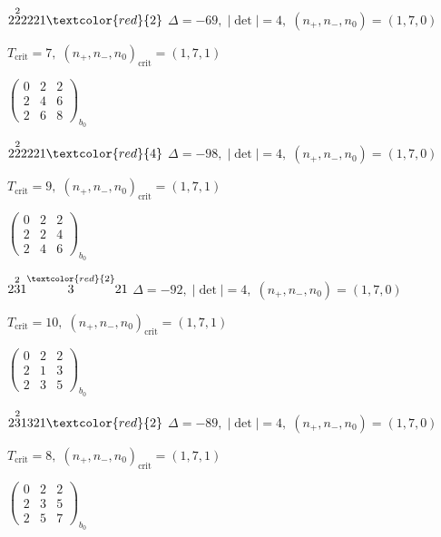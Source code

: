 \documentclass[10pt]{article}
\begin{document}
$2\overset{2}{2}2221\textcolor{red}{2}$ \quad $\Delta=-69,\; |\det|=4,\; (n_+,n_-,n_0)=(1,7,0)$

\hspace{1em}$T_{\text{crit}}=7,\; (n_+,n_-,n_0)_{\text{crit}}=(1,7,1)$

\hspace{2em}$\left(\begin{smallmatrix}0 & 2 & 2 \\ 2 & 4 & 6 \\ 2 & 6 & 8\end{smallmatrix}\right)_{\!b_0}$

$2\overset{2}{2}2221\textcolor{red}{4}$ \quad $\Delta=-98,\; |\det|=4,\; (n_+,n_-,n_0)=(1,7,0)$

\hspace{1em}$T_{\text{crit}}=9,\; (n_+,n_-,n_0)_{\text{crit}}=(1,7,1)$

\hspace{2em}$\left(\begin{smallmatrix}0 & 2 & 2 \\ 2 & 2 & 4 \\ 2 & 4 & 6\end{smallmatrix}\right)_{\!b_0}$

\smallskip

$2\overset{2}{3}1\overset{\textcolor{red}{2}}{3}21$ \quad $\Delta=-92,\; |\det|=4,\; (n_+,n_-,n_0)=(1,7,0)$

\hspace{1em}$T_{\text{crit}}=10,\; (n_+,n_-,n_0)_{\text{crit}}=(1,7,1)$

\hspace{2em}$\left(\begin{smallmatrix}0 & 2 & 2 \\ 2 & 1 & 3 \\ 2 & 3 & 5\end{smallmatrix}\right)_{\!b_0}$

$2\overset{2}{3}1321\textcolor{red}{2}$ \quad $\Delta=-89,\; |\det|=4,\; (n_+,n_-,n_0)=(1,7,0)$

\hspace{1em}$T_{\text{crit}}=8,\; (n_+,n_-,n_0)_{\text{crit}}=(1,7,1)$

\hspace{2em}$\left(\begin{smallmatrix}0 & 2 & 2 \\ 2 & 3 & 5 \\ 2 & 5 & 7\end{smallmatrix}\right)_{\!b_0}$
\end{document}
